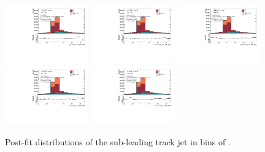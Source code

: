 \begin{figure}[htbp]
  \centering
 \includegraphics[width=0.32\textwidth]{figures/gbb/Sub_Sd0_Fits/Canv_Fit_0-Deltaphi-0628_LpT_INF_SpT_INF_coarse_y.pdf}
 \includegraphics[width=0.32\textwidth]{figures/gbb/Sub_Sd0_Fits/Canv_Fit_0628-Deltaphi-1256_LpT_INF_SpT_INF_coarse_y.pdf}
 \includegraphics[width=0.32\textwidth]{figures/gbb/Sub_Sd0_Fits/Canv_Fit_1256-Deltaphi-1884_LpT_INF_SpT_INF_coarse_y.pdf}\\
 \includegraphics[width=0.32\textwidth]{figures/gbb/Sub_Sd0_Fits/Canv_Fit_1884-Deltaphi-2512_LpT_INF_SpT_INF_coarse_y.pdf}
 \includegraphics[width=0.32\textwidth]{figures/gbb/Sub_Sd0_Fits/Canv_Fit_2512-Deltaphi-3140_LpT_INF_SpT_INF_coarse_y.pdf}

\caption{Post-fit \subsdzero distributions of the sub-leading track jet in bins of \dphi. }
  \label{fig:dphi-postfits-subleading}
\end{figure}


